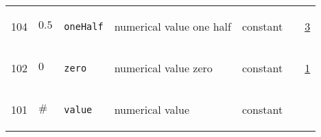 \begin{longtable}{|p{1cm}|p{2.5cm}|p{4.5cm}|p{8cm}|p{3.0cm}|p{3cm}|p{1cm}|}
            104
             & \hypertarget{"v:104"}{ $ {0.5}{_{}} $}
             & \verb|oneHalf|
             & numerical value one half
             & \begin{lay}constant \end{lay}
             & $  $
             &                 \hyperlink{"e:3"}{ 3 }
                 \\
            102
             & \hypertarget{"v:102"}{ $ {0}{_{}} $}
             & \verb|zero|
             & numerical value zero
             & \begin{lay}constant \end{lay}
             & $  $
             &                 \hyperlink{"e:1"}{ 1 }
                 \\
            101
             & \hypertarget{"v:101"}{ $ {{\#}}{_{}} $}
             & \verb|value|
             & numerical value
             & \begin{lay}constant \end{lay}
             & $  $
             & \\
    \end{longtable}